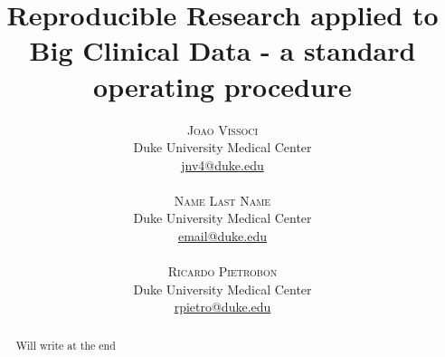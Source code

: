 \documentclass[twoside]{article}
\title{\vspace{-15mm}\fontsize{24pt}{10pt}\selectfont\textbf{Reproducible Research applied to Big Clinical Data - a standard operating procedure}} %
\author{
\large
\textsc{Joao Vissoci}\\[2mm] %
\normalsize Duke University Medical Center \\ %
\normalsize \href{mailto:jnv4@duke.edu}{jnv4@duke.edu} \\\\%
\textsc{Name Last Name}\\[2mm] %
\normalsize Duke University Medical Center \\ %
\normalsize \href{mailto:email@duke.edu}{email@duke.edu} \\\\%
\textsc{Ricardo Pietrobon}\\[2mm] %
\normalsize Duke University  Medical Center\\ %
\normalsize \href{mailto:rpietro@duke.edu}{rpietro@duke.edu} \\%
\vspace{-5mm}
}
\date{}
\begin{document}
\maketitle %

\thispagestyle{fancy} %


\begin{abstract}

Will write at the end

\end{abstract}

\end{document}
